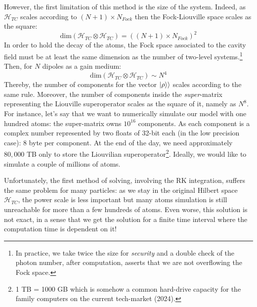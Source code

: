 \documentclass[11pt]{report}
\DeclarePairedDelimiter\kket{\lvert}{\rangle\rangle}
\begin{document}
However, the first limitation of this method is the size of the system. Indeed, as $\mathscr{H}_{TC}$ scales according to $(N+1) \times N_{Fock}$ then the Fock-Liouville space scales as the square:
\begin{equation}
\textrm{dim}\left(\mathscr{H}_{TC} \otimes \mathscr{H}_{TC}\right) = \left((N+1) \times N_{Fock}\right)^2
\end{equation}
In order to hold the decay of the atoms, the Fock space associated to the cavity field must be at least the same dimension as the number of two-level systems.\footnote{In practice, we take twice the size for \textit{security} and a double check of the photon number, after computation, asserts that we are not overflowing the Fock space.} Then, for $N$ dipoles as a gain medium:
\begin{equation}
\textrm{dim}\left(\mathscr{H}_{TC} \otimes \mathscr{H}_{TC}\right) \sim N^4
\end{equation}
Thereby, the number of components for the vector $\kket{\rho}$ scales according to the same rule. Moreover, the number of components inside the \textit{super}-matrix representing the Liouville superoperator scales as the square of it, namely as $N^8$. For instance, let's say that we want to numerically simulate our model with one hundred atoms: the super-matrix owns $10^{16}$ components. As each component is a complex number represented by two floats of 32-bit each (in the low precision case): 8 byte per component. At the end of the day, we need approximately $80,000$ TB only to store the Liouvilian superoperator\footnote{1 TB = 1000 GB which is somehow a common hard-drive capacity for the family computers on the current tech-market (2024).}. Ideally, we would like to simulate a couple of millions of atoms.

Unfortunately, the first method of solving, involving the RK integration, suffers the same problem for many particles: as we stay in the original Hilbert space $\mathscr{H}_{TC}$, the power scale is less important but many atoms simulation is still unreachable for more than a few hundreds of atoms. Even worse, this solution is not exact, in a sense that we get the solution for a finite time interval where the computation time is dependent on it!
\end{document}
